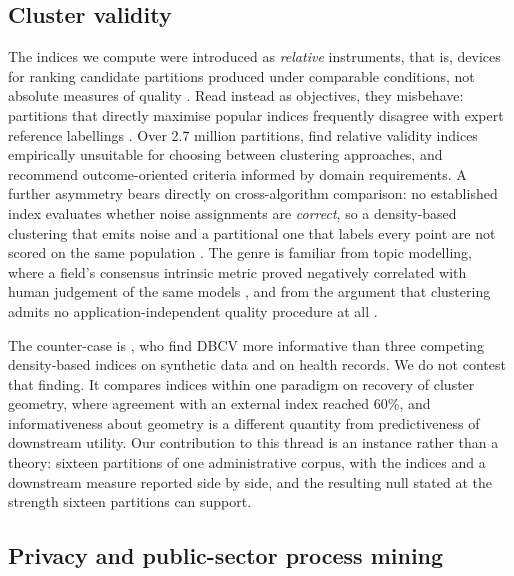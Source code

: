 \subsection{Cluster validity}\label{subsec:rw-validity}

The indices we compute were introduced as \emph{relative} instruments, that is, devices for
ranking candidate partitions produced under comparable conditions, not absolute measures of
quality \citep{rousseeuw1987silhouettes, daviesbouldin1979measure, calinski1974dendrite,
moulavi2014dbcv}. Read instead as objectives, they misbehave: partitions that directly maximise
popular indices frequently disagree with expert reference labellings \citep{gagolewski2021invalid}.
Over 2.7 million partitions, \citet{yerbury2025rvi} find relative validity indices empirically
unsuitable for choosing between clustering approaches, and recommend outcome-oriented criteria
informed by domain requirements. A further asymmetry bears directly on cross-algorithm
comparison: no established index evaluates whether noise assignments are \emph{correct}, so a
density-based clustering that emits noise and a partitional one that labels every point are not
scored on the same population \citep{beer2026disco}. The genre is familiar from topic modelling,
where a field's consensus intrinsic metric proved negatively correlated with human judgement of
the same models \citep{chang2009teahaves}, and from the argument that clustering admits no
application-independent quality procedure at all \citep{vonluxburg2012clustering}.

The counter-case is \citet{chicco2025dbcv}, who find DBCV more informative than three competing
density-based indices on synthetic data and on health records. We do not contest that finding. It
compares indices within one paradigm on recovery of cluster geometry, where agreement with an
external index reached 60\%, and informativeness about geometry is a different quantity from
predictiveness of downstream utility. Our contribution to this thread is an instance rather than a
theory: sixteen partitions of one administrative corpus, with the indices and a downstream measure
reported side by side, and the resulting null stated at the strength sixteen partitions can
support.

\subsection{Privacy and public-sector process mining}\label{subsec:rw-privacy-public}

